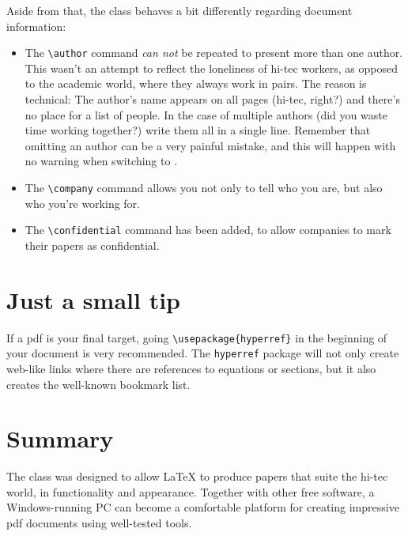 \documentclass{hitec}
\newcommand{\HT}{\textsc{\raisebox{0.1em}{h}\raisebox{-0.1em}{i}%
	\raisebox{0.1em}{t}\raisebox{-0.1em}{e}\raisebox{0.1em}{c} }}
\begin{document}
Aside from that, the \HT class behaves a bit differently regarding document information:
\begin{itemize}
\item The \verb+\author+ command \emph{can not} be repeated to
present	more than one author. This wasn't an attempt to reflect the loneliness of hi-tec
workers, as opposed to the academic world, where they always work in pairs. The reason
is technical: The author's name appears on all pages (hi-tec, right?) and there's no place
for a list of people. In the case of multiple authors (did you waste time working together?)
write them all in a single line. Remember that omitting an author can be a very painful
mistake, and this will happen with no warning when switching to \HT.
%
\item The \verb+\company+ command allows you not only to tell who you are,
but also who you're working for.
%
\item The \verb+\confidential+ command has been added, to allow companies
to mark their papers as confidential.
\end{itemize}
\section{Just a small tip}
If a pdf is your final target, going \verb+\usepackage{hyperref}+
in the beginning of your document is very recommended. The \texttt{hyperref} package
will not only create web-like links where there are references to equations or sections,
but it also creates the well-known bookmark list.
\section{Summary}
The \HT class was designed to allow \LaTeX \hspace{0pt} to produce papers that suite
the hi-tec world, in functionality and appearance. Together with other free software,
a Windows-running PC can become a comfortable platform for creating impressive pdf documents
using well-tested tools.
\end{document}
